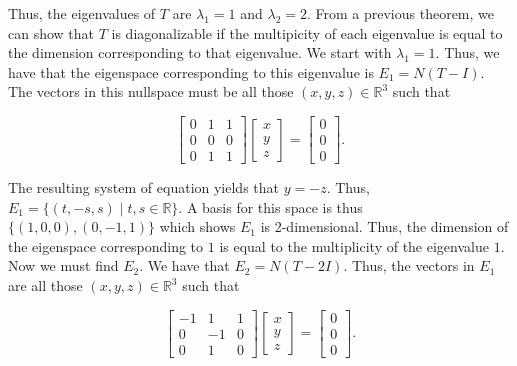 \documentclass[12pt, a4paper]{article}
\begin{document}
\vspace{2mm}

\noindent Thus, the eigenvalues of $T$ are $\lambda_1=1$ and $\lambda_2=2$. From a previous theorem, we can show that $T$ is diagonalizable if the multipicity of each eigenvalue is equal to the dimension corresponding to that eigenvalue. We start with $\lambda_1=1$. Thus, we have that the eigenspace corresponding to this eigenvalue is $E_1=N(T-I)$. The vectors in this nullspace must be all those $(x,y,z)\in\mathbb{R}^3$ such that

\begin{equation*}
    \begin{bmatrix}
        0 & 1 & 1 \\
        0 & 0 & 0 \\
        0 & 1 & 1 
    \end{bmatrix}
    \begin{bmatrix}
        x \\
        y \\
        z
    \end{bmatrix}
    =
    \begin{bmatrix}
        0 \\
        0 \\
        0
    \end{bmatrix}.
\end{equation*}

\newpage

\noindent The resulting system of equation yields that $y=-z$. Thus, $E_1=\{(t,-s,s)\mid t,s\in\mathbb{R}\}$. A basis for this space is thus $\{(1,0,0), (0,-1,1)\}$ which shows $E_1$ is 2-dimensional. Thus, the dimension of the eigenspace corresponding to $1$ is equal to the multiplicity of the eigenvalue $1$. Now we must find $E_2$. We have that $E_2=N(T-2I)$. Thus, the vectors in $E_1$ are all those $(x,y,z)\in\mathbb{R}^3$ such that

\begin{equation*}
    \begin{bmatrix}
        -1 & 1 & 1 \\
         0 & -1 & 0 \\
         0 & 1 & 0 
    \end{bmatrix}
    \begin{bmatrix}
        x \\
        y \\
        z
    \end{bmatrix}
    =
    \begin{bmatrix}
        0 \\
        0 \\
        0
    \end{bmatrix}.
\end{equation*}
\end{document}
